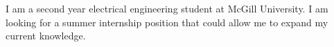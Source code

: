 \begin{cvletter}
    I am a second year electrical engineering student at McGill University. I am looking
    for a summer internship position that could allow me to expand my current
    knowledge.     
\end{cvletter}
